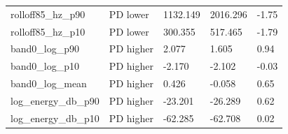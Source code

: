 \documentclass[11pt,a4paper]{article}
\begin{document}
\begin{center}
\begin{longtable}{>{\raggedright\arraybackslash}p{4.20cm}>{\raggedright\arraybackslash}p{2.55cm}>{\raggedleft\arraybackslash}p{2.55cm}>{\raggedleft\arraybackslash}p{2.55cm}>{\raggedleft\arraybackslash}p{2.55cm}}
\hspace{0pt}rolloff85\_\allowbreak{}hz\_\allowbreak{}p90 & \hspace{0pt}PD lower & \hspace{0pt}1132.149 & \hspace{0pt}2016.296 & \hspace{0pt}-1.75\\
\hspace{0pt}rolloff85\_\allowbreak{}hz\_\allowbreak{}p10 & \hspace{0pt}PD lower & \hspace{0pt}300.355 & \hspace{0pt}517.465 & \hspace{0pt}-1.79\\
\hspace{0pt}band0\_\allowbreak{}log\_\allowbreak{}p90 & \hspace{0pt}PD higher & \hspace{0pt}2.077 & \hspace{0pt}1.605 & \hspace{0pt}0.94\\
\hspace{0pt}band0\_\allowbreak{}log\_\allowbreak{}p10 & \hspace{0pt}PD higher & \hspace{0pt}-2.170 & \hspace{0pt}-2.102 & \hspace{0pt}-0.03\\
\hspace{0pt}band0\_\allowbreak{}log\_\allowbreak{}mean & \hspace{0pt}PD higher & \hspace{0pt}0.426 & \hspace{0pt}-0.058 & \hspace{0pt}0.65\\
\hspace{0pt}log\_\allowbreak{}energy\_\allowbreak{}db\_\allowbreak{}p90 & \hspace{0pt}PD higher & \hspace{0pt}-23.201 & \hspace{0pt}-26.289 & \hspace{0pt}0.62\\
\hspace{0pt}log\_\allowbreak{}energy\_\allowbreak{}db\_\allowbreak{}p10 & \hspace{0pt}PD higher & \hspace{0pt}-62.285 & \hspace{0pt}-62.708 & \hspace{0pt}0.02\\

\end{longtable}
\end{center}
\end{document}
